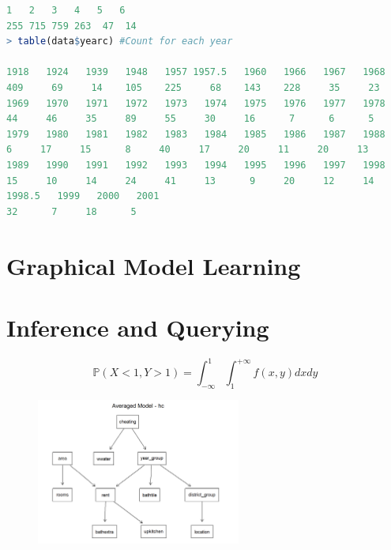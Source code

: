 \documentclass[15pt,a4paper]{report}
\begin{document}
\begin{itemize}
\begin{lstlisting}[language=R]
1   2   3   4   5   6 
255 715 759 263  47  14 
> table(data$yearc) #Count for each year

1918   1924   1939   1948   1957 1957.5   1960   1966   1967   1968 
409     69     14    105    225     68    143    228     35     23 
1969   1970   1971   1972   1973   1974   1975   1976   1977   1978 
44     46     35     89     55     30     16      7      6      5 
1979   1980   1981   1982   1983   1984   1985   1986   1987   1988 
6     17     15      8     40     17     20     11     20     13 
1989   1990   1991   1992   1993   1994   1995   1996   1997   1998 
15     10     14     24     41     13      9     20     12     14 
1998.5   1999   2000   2001 
32      7     18      5 
	\end{lstlisting}
\end{itemize}

\section*{Graphical Model Learning}
\section*{Inference and Querying}
\newpage

\[
\mathbb{P}(X<1,Y>1)=\int_{-\infty}^{1}\int_{1}^{+\infty}f(x,y) dx dy 
\]
\begin{figure}[H]
	\centering \includegraphics[width=0.6\textwidth]{unnamed-chunk-30-2.png}
\end{figure}
\end{document}
